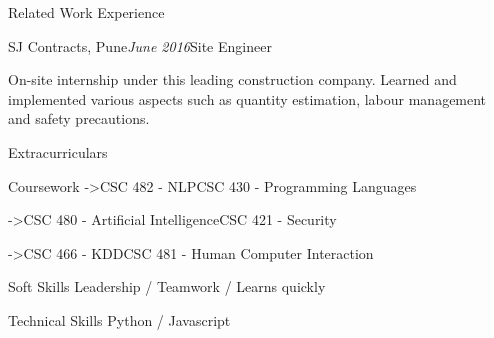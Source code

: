 \documentclass{resume4}%
\begin{document}
\begin{flushleft}
\begin{rSection}{Related Work Experience}
\begin{rSubsection}{SJ Contracts, Pune}{\textit{June 2016}}{Site Engineer}{}
\item{On{-}site internship under this leading construction company. Learned and implemented various aspects such as quantity estimation, labour management and safety precautions.}%
\end{rSubsection}%
\end{rSection}%
\begin{rSection}{Extracurriculars}%
%
%
\end{rSection}%
\begin{rSection}{Coursework}%
\text->{CSC 482 {-} NLP}{CSC 430 {-} Programming Languages}%
\item->{CSC 480 {-} Artificial Intelligence}{CSC 421 {-} Security}%
\item->{CSC 466 {-} KDD}{CSC 481 {-} Human Computer Interaction}%
\end{rSection}%
\begin{rSection}{Soft Skills}%
Leadership / Teamwork / Learns quickly%
\end{rSection}%
\begin{rSection}{Technical Skills}%
Python / Javascript%
\end{rSection}%
\end{flushleft}%
\end{document}
